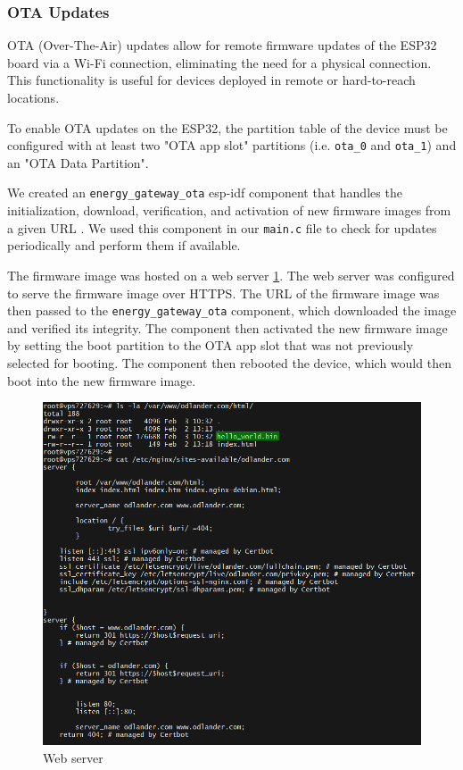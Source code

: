 \subsubsection{OTA Updates}

OTA (Over-The-Air) updates allow for remote firmware updates of the ESP32 board via a Wi-Fi connection, eliminating the need for a physical connection. This functionality is useful for devices deployed in remote or hard-to-reach locations.

To enable OTA updates on the ESP32, the partition table of the device must be configured with at least two "OTA app slot" partitions (i.e. \texttt{ota\_0} and \texttt{ota\_1}) and an "OTA Data Partition". 

We created an \texttt{energy\_gateway\_ota} esp-idf component that handles the initialization, download, verification, and activation of new firmware images from a given URL \cite{energy-gateway:github}. We used this component in our \texttt{main.c} file to check for updates periodically and perform them if available.

The firmware image was hosted on a web server \ref{fig:web_server}. The web server was configured to serve the firmware image over HTTPS. The URL of the firmware image was then passed to the \texttt{energy\_gateway\_ota} component, which downloaded the image and verified its integrity. The component then activated the new firmware image by setting the boot partition to the OTA app slot that was not previously selected for booting. The component then rebooted the device, which would then boot into the new firmware image.

\begin{figure}[ht]
  \centering
  \includegraphics[width=0.8\linewidth]{figures/web_server.png}
  \caption{Web server}
  \label{fig:web_server}
\end{figure}

